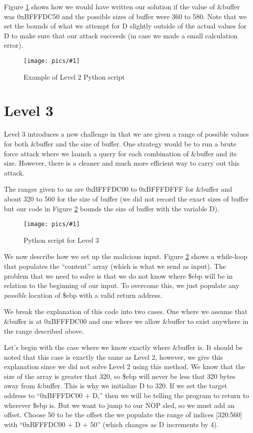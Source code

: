 \documentclass[11pt]{article}
\newcommand{\fig}[2]{ 
\begin{figure}[h]
	\centering
	\caption{#2}
	\texttt{[image: pics/\#1]}
	\label{fig:#1}
\end{figure} 
}
\begin{document}
Figure \ref{fig:level2} shows how we would have written our solution if the value of \&buffer was 0xBFFFDC50 and the possible sizes of buffer were 360 to 580. Note that we set the bounds of what we attempt for D slightly outside of the actual values for D to make sure that our attack succeeds (in case we made a small calculation error).

\fig{level2}{Example of Level 2 Python script}

\newpage

\section*{Level 3}

Level 3 introduces a new challenge in that we are given a range of possible values for both \&buffer and the size of buffer. One strategy would be to run a brute force attack where we launch a query for each combination of \&buffer and its size. However, there is a cleaner and much more efficient way to carry out this attack.

The ranges given to us are 0xBFFFDC00 to 0xBFFFDFFF for \&buffer and about 320 to 560 for the size of buffer (we did not record the exact sizes of buffer but our code in Figure \ref{fig:level3} bounds the size of buffer with the variable D).

\fig{level3}{Python script for Level 3}

We now describe how we set up the malicious input. Figure \ref{fig:level3} shows a while-loop that populates the ``content'' array (which is what we send as input). The problem that we need to solve is that we do not know where \$ebp will be in relation to the beginning of our input. To overcome this, we just populate any \textit{possible} location of \$ebp with a valid return address. 

We break the explanation of this code into two cases. One where we assume that \&buffer is at 0xBFFFDC00 and one where we allow \&buffer to exist anywhere in the range described above. 

Let's begin with the case where we know exactly where \&buffer is. It should be noted that this case is exactly the same as Level 2, however, we give this explanation since we did not solve Level 2 using this method. We know that the size of the array is greater that 320, so \$ebp will never be less that 320 bytes away from \&buffer. This is why we initialize D to 320. If we set the target address to ``0xBFFFDC00 + D,'' then we will be telling the program to return to wherever \$ebp is. But we want to jump to our NOP sled, so we must add an offset. Choose 50 to be the offset the we populate the range of indices [320:560] with ``0xBFFFDC00 + D + 50'' (which changes as D increments by 4).
\end{document}
